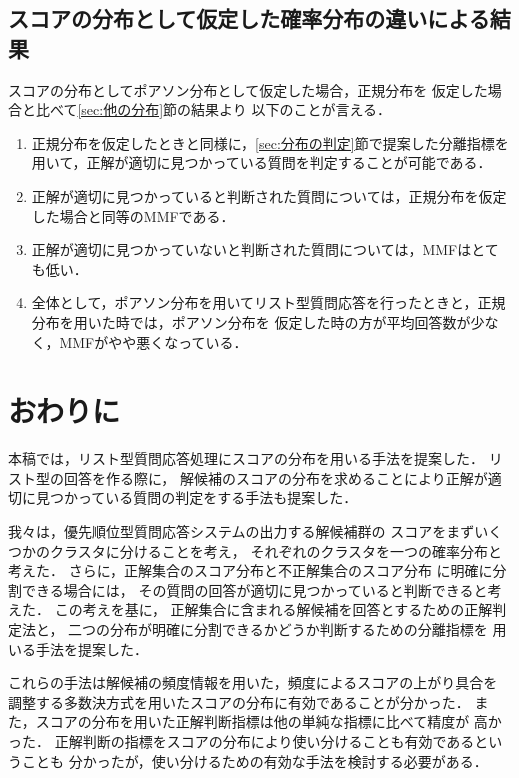 \documentclass[japanese]{jnlp_1.4}
\begin{document}
\subsection{スコアの分布として仮定した確率分布の違いによる結果}

スコアの分布としてポアソン分布として仮定した場合，正規分布を
仮定した場合と比べて\ref{sec:他の分布}節の結果より
以下のことが言える．
\begin{enumerate}
\item 正規分布を仮定したときと同様に，\ref{sec:分布の判定}節で提案した分離指標を用いて，正解が適切に見つかっている質問を判定することが可能である．
\item 正解が適切に見つかっていると判断された質問については，正規分布を仮定した場合と同等のMMFである．
\item 正解が適切に見つかっていないと判断された質問については，MMFはとても低い．
\item 全体として，ポアソン分布を用いてリスト型質問応答を行ったときと，正規分布を用いた時では，ポアソン分布を
仮定した時の方が平均回答数が少なく，MMFがやや悪くなっている．
\end{enumerate}



\section{おわりに}\label{Chapter:conclusion}

本稿では，リスト型質問応答処理にスコアの分布を用いる手法を提案した．
リスト型の回答を作る際に，
解候補のスコアの分布を求めることにより正解が適切に見つかっている質問の判定をする手法も提案した．

我々は，優先順位型質問応答システムの出力する解候補群の
スコアをまずいくつかのクラスタに分けることを考え，
それぞれのクラスタを一つの確率分布と考えた．
さらに，正解集合のスコア分布と不正解集合のスコア分布
に明確に分割できる場合には，
その質問の回答が適切に見つかっていると判断できると考えた．
この考えを基に，
正解集合に含まれる解候補を回答とするための正解判定法と，
二つの分布が明確に分割できるかどうか判断するための分離指標を
用いる手法を提案した．

これらの手法は解候補の頻度情報を用いた，頻度によるスコアの上がり具合を
調整する多数決方式を用いたスコアの分布に有効であることが分かった．
また，スコアの分布を用いた正解判断指標は他の単純な指標に比べて精度が
高かった．
正解判断の指標をスコアの分布により使い分けることも有効であるということも
分かったが，使い分けるための有効な手法を検討する必要がある．
\end{document}
